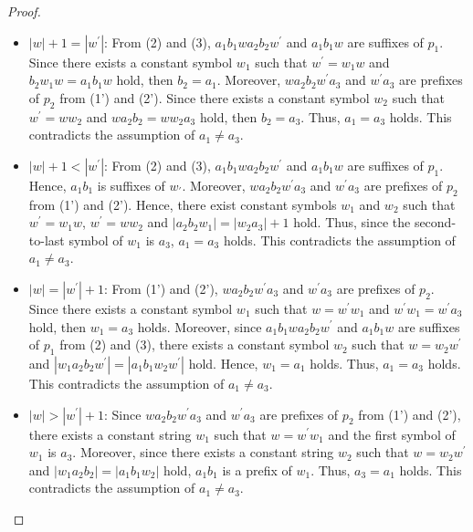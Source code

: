 \begin{proof}
\begin{itemize}
\item $|w|+1=|w^{\prime}|$: From (2) and (3), $a_{1}b_{1}wa_{2}b_{2}w^{\prime}$ and $a_{1}b_{1}w$ are suffixes of $p_{1}$.
Since there exists a constant symbol $w_{1}$ such that $w^{\prime}=w_{1}w$ and $b_{2}w_{1}w=a_{1}b_{1}w$ hold,
then $b_{2}=a_{1}$.
Moreover, $wa_{2}b_{2}w^{\prime}a_{3}$ and $w^{\prime}a_{3}$ are prefixes of $p_{2}$ from (1') and (2').
Since there exists a constant symbol $w_{2}$ such that $w^{\prime}=ww_{2}$ and $wa_{2}b_{2}=ww_{2}a_{3}$ hold,
then $b_{2}=a_{3}$.
Thus, $a_{1} = a_{3}$ holds.
This contradicts the assumption of $a_{1} \ne a_{3}$.
%
\item $|w|+1 < |w^{\prime}|$: From (2) and (3), $a_{1}b_{1}wa_{2}b_{2}w^{\prime}$ and $a_{1}b_{1}w$ are suffixes of $p_{1}$.
Hence, $a_{1}b_{1}$ is suffixes of $w_{\prime}$.
Moreover, $wa_{2}b_{2}w^{\prime}a_{3}$ and $w^{\prime}a_{3}$ are prefixes of $p_{2}$ from (1') and (2').
Hence, there exist constant symbols $w_{1}$ and $w_{2}$ such that $w^{\prime}=w_{1}w$, $w^{\prime}=ww_{2}$ and $|a_{2}b_{2}w_{1}|=|w_{2}a_{3}|+1$ hold.
Thus, since the second-to-last symbol of $w_{1}$ is $a_{3}$, $a_{1}=a_{3}$ holds.
This contradicts the assumption of $a_{1} \ne a_{3}$.
%
\item $|w|=|w^{\prime}|+1$: From (1') and (2'), $wa_{2}b_{2}w^{\prime}a_{3}$ and $w^{\prime}a_{3}$ are prefixes of $p_{2}$.
Since there exists a constant symbol $w_{1}$ such that $w=w^{\prime}w_{1}$ and $w^{\prime}w_{1}=w^{\prime}a_{3}$ hold, then $w_{1}=a_{3}$ holds.
Moreover, since $a_{1}b_{1}wa_{2}b_{2}w^{\prime}$ and $a_{1}b_{1}w$ are suffixes of $p_{1}$ from (2) and (3), 
there exists a constant symbol $w_{2}$ such that $w=w_{2}w^{\prime}$ and $|w_{1}a_{2}b_{2}w^{\prime}|=|a_{1}b_{1}w_{2}w^{\prime}|$ hold.
Hence, $w_{1}=a_{1}$ holds.
Thus, $a_{1}=a_{3}$ holds.
This contradicts the assumption of $a_{1}\ne a_{3}$.
%
\item $|w| > |w^{\prime}|+1$: Since $wa_{2}b_{2}w^{\prime}a_{3}$ and $w^{\prime}a_{3}$ are prefixes of $p_{2}$ from (1') and (2'),
there exists a constant string $w_{1}$ such that $w=w^{\prime}w_{1}$ and the first symbol of $w_{1}$ is $a_{3}$.
Moreover, since there exists a constant string $w_{2}$ such that $w=w_{2}w^{\prime}$ and $|w_{1}a_{2}b_{2}|=|a_{1}b_{1}w_{2}|$ hold,
$a_{1}b_{1}$ is a prefix of $w_{1}$.
Thus, $a_{3}=a_{1}$ holds.
This contradicts the assumption of $a_{1} \ne a_{3}$.
\end{itemize}

\smallskip


\end{proof}
